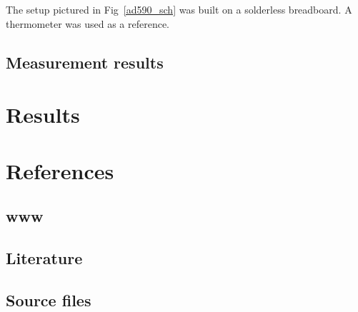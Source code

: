\documentclass[draft,11pt,a4paper]{article}
\begin{document}
The setup pictured in Fig~\ref{ad590_sch} was built on a solderless breadboard.
A thermometer was used as a reference. 

\subsection{Measurement results}\label{TODO}


\section{Results}\label{setup}


\newpage

\section{References}\label{references}

\subsection{www}\label{literature}

\subsection{Literature}\label{literature}

\subsection{Source files}\label{sources}

\end{document}
